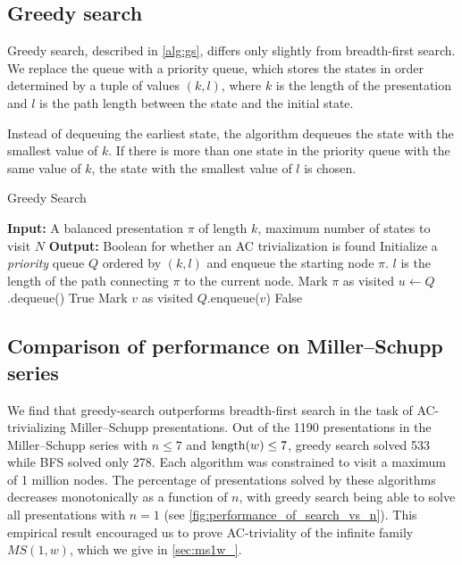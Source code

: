 \subsection{Greedy search}\label{ss:greedy_search}

Greedy search, described in \cref{alg:gs}, differs only slightly from breadth-first search. We replace the queue with a priority queue, which stores the states in order determined by a tuple of values $(k, l)$, where $k$ is the length of the presentation and $l$ is the path length between the state and the initial state.

Instead of dequeuing the earliest state, the algorithm dequeues the state with the smallest value of $k$. If there is more than one state in the priority queue with the same value of $k$, the state with the smallest value of $l$ is chosen.

\begin{algorithm}
	\caption{Greedy Search}\label{alg:gs}
	\begin{algorithmic}[1] %
		\State \textbf{Input:} A balanced presentation $\pi$ of length $k$, maximum number of states to visit $N$
		\State \textbf{Output:} Boolean for whether an AC trivialization is found
		\State Initialize a \textit{priority} queue $Q$ ordered by $(k, l)$ and enqueue the starting node $\pi$.
		$l$ is the length of the path connecting $\pi$ to the current node.
		\State Mark $\pi$ as visited
		\State $u \gets Q$.dequeue() 
		\State \Return True 
		\EndIf
		\State Mark $v$ as visited
		\State $Q$.enqueue($v$) 
		\EndIf
		\EndFor
		\EndWhile
		\State \Return False 
	\end{algorithmic}
\end{algorithm}

\subsection{Comparison of performance on Miller--Schupp series}\label{sec:search-ms}

We find that greedy-search outperforms breadth-first search in the task of AC-trivializing Miller--Schupp presentations. %
Out of the 1190 presentations in the Miller--Schupp series with $n \leq 7$ and $\operatorname{length}(w) \leq 7$, greedy search solved 533 while BFS solved only 278.
Each algorithm was constrained to visit a maximum of 1 million nodes.
The percentage of presentations solved by these algorithms decreases monotonically as a function of $n$, with greedy search being able to solve all presentations with $n=1$ (see \cref{fig:performance_of_search_vs_n}).
This empirical result encouraged us to prove AC-triviality of the infinite family $MS(1, w)$, which we give in \cref{sec:ms1w_}.

